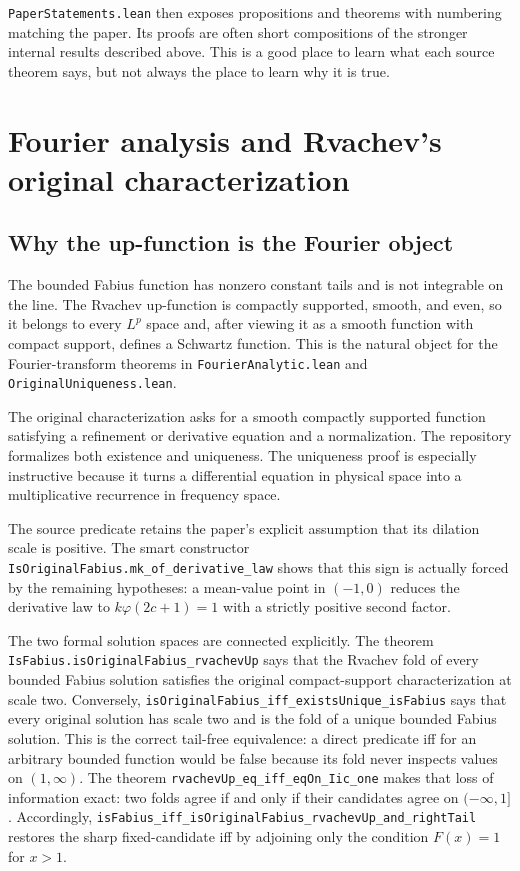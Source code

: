 \documentclass[11pt,oneside]{article}
\theoremstyle{definition}
\theoremstyle{remark}
\begin{document}
\nolinkurl{PaperStatements.lean} then exposes propositions and theorems with numbering matching the paper.  Its proofs are often short compositions of the stronger internal results described above.  This is a good place to learn what each source theorem says, but not always the place to learn why it is true.

\section{Fourier analysis and Rvachev's original characterization}\label{ch:fourier}

\subsection{Why the up-function is the Fourier object}
The bounded Fabius function has nonzero constant tails and is not integrable on the line.  The Rvachev up-function is compactly supported, smooth, and even, so it belongs to every \(L^p\) space and, after viewing it as a smooth function with compact support, defines a Schwartz function.  This is the natural object for the Fourier-transform theorems in \nolinkurl{FourierAnalytic.lean} and \nolinkurl{OriginalUniqueness.lean}.

The original characterization asks for a smooth compactly supported function satisfying a refinement or derivative equation and a normalization.  The repository formalizes both existence and uniqueness.  The uniqueness proof is especially instructive because it turns a differential equation in physical space into a multiplicative recurrence in frequency space.

The source predicate retains the paper's explicit assumption that its dilation scale is
positive.  The smart constructor \nolinkurl{IsOriginalFabius.mk_of_derivative_law} shows that this
sign is actually forced by the remaining hypotheses: a mean-value point in $(-1,0)$ reduces
the derivative law to $k\varphi(2c+1)=1$ with a strictly positive second factor.

The two formal solution spaces are connected explicitly.  The theorem
\nolinkurl{IsFabius.isOriginalFabius_rvachevUp} says that the Rvachev fold of every bounded
Fabius solution satisfies the original compact-support characterization at scale two.
Conversely, \nolinkurl{isOriginalFabius_iff_existsUnique_isFabius} says that every original
solution has scale two and is the fold of a unique bounded Fabius solution.  This is the
correct tail-free equivalence: a direct predicate iff for an arbitrary bounded function
would be false because its fold never inspects values on $(1,\infty)$.  The theorem
\nolinkurl{rvachevUp_eq_iff_eqOn_Iic_one} makes that loss of information exact: two folds agree
if and only if their candidates agree on $(-\infty,1]$.  Accordingly,
\nolinkurl{isFabius_iff_isOriginalFabius_rvachevUp_and_rightTail} restores the sharp
fixed-candidate iff by adjoining only the condition $F(x)=1$ for $x>1$.
\end{document}
